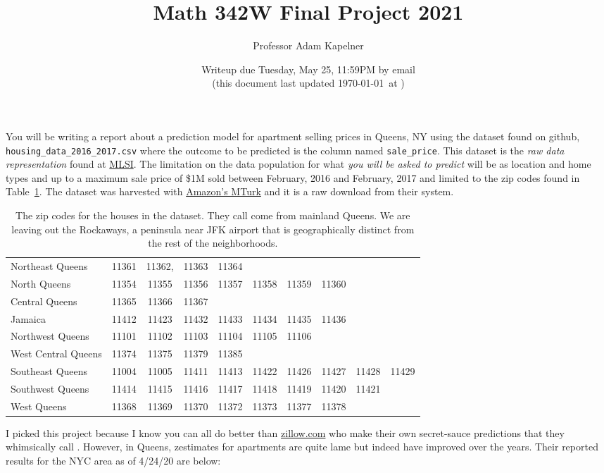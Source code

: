 \documentclass[12pt]{article}
\title{Math 342W Final Project 2021}
\author{Professor Adam Kapelner}
\date{Writeup due Tuesday, May 25, 11:59PM by email\\ \vspace{0.5cm} \footnotesize (this document last updated \today ~at \currenttime)}
\begin{document}
\maketitle

You will be writing a report about a prediction model for apartment selling prices in Queens, NY using the dataset found on github, \texttt{housing\_data\_2016\_2017.csv} where the outcome to be predicted is the column named \texttt{sale\_price}. This dataset is the \emph{raw data representation} found at \href{http://www.mlsli.com/}{MLSI}. The limitation on the data population for what \emph{you will be asked to predict} will be  as location and home types  and  up to a maximum sale price of \$1M sold between February, 2016 and February, 2017 and limited to the zip codes found in Table~\ref{tab:zips}. The dataset was harvested with \href{mturk.com}{Amazon's MTurk} and it is a raw download from their system.


\begin{table}[htp]
\centering\small
\begin{tabular}{l|ccccccccc}
\hline
Northeast Queens		&11361& 11362,& 11363& 11364 \\
North Queens		&11354& 11355& 11356& 11357& 11358& 11359& 11360 \\
Central Queens		&11365& 11366& 11367 \\
Jamaica				&11412& 11423& 11432& 11433& 11434& 11435& 11436 \\
Northwest Queens	&11101& 11102& 11103& 11104& 11105& 11106 \\
West Central Queens	&11374& 11375& 11379& 11385 \\
Southeast Queens		&11004& 11005& 11411& 11413& 11422& 11426& 11427& 11428& 11429 \\
Southwest Queens	&11414& 11415& 11416& 11417& 11418& 11419& 11420& 11421 \\
West Queens			&11368& 11369& 11370& 11372& 11373& 11377& 11378 \\\hline
\end{tabular}
\label{tab:zips}
\caption{The zip codes for the houses in the dataset. They call come from mainland Queens. We are leaving out the Rockaways, a peninsula near JFK airport that is geographically distinct from the rest of the neighborhoods.}
\end{table}

I picked this project because I know you can all do better than \url{zillow.com} who make their own secret-sauce predictions that they whimsically call . However, in Queens, zestimates for apartments are quite lame but indeed have improved over the years. Their reported results for the NYC area as of 4/24/20 are below:
\end{document}
